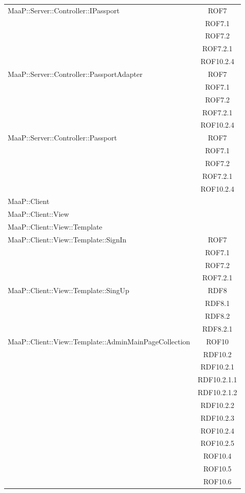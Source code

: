 \begin{center}
\begin{longtable}{|p{0.8\linewidth}|c|}
\midrule 
MaaP::Server::Controller::IPassport
& ROF7\\
& ROF7.1\\
& ROF7.2\\
& ROF7.2.1\\
& ROF10.2.4\\

\midrule 
MaaP::Server::Controller::PassportAdapter 
& ROF7\\
& ROF7.1\\
& ROF7.2\\
& ROF7.2.1\\
& ROF10.2.4\\

\midrule 
MaaP::Server::Controller::Passport
& ROF7\\
& ROF7.1\\
& ROF7.2\\
& ROF7.2.1\\
& ROF10.2.4\\

\midrule 
MaaP::Client 
& \\

\midrule 
MaaP::Client::View 
& \\

\midrule 
MaaP::Client::View::Template
& \\

\midrule 
MaaP::Client::View::Template::SignIn
& ROF7\\
& ROF7.1\\
& ROF7.2\\
& ROF7.2.1\\

\midrule 
MaaP::Client::View::Template::SingUp
& RDF8\\
& RDF8.1\\
& RDF8.2\\
& RDF8.2.1\\

\midrule 
MaaP::Client::View::Template::AdminMainPageCollection
& ROF10\\
& RDF10.2\\
& RDF10.2.1\\
& RDF10.2.1.1\\
& RDF10.2.1.2\\
& RDF10.2.2\\
& RDF10.2.3\\
& ROF10.2.4\\
& ROF10.2.5\\
& ROF10.4\\
& ROF10.5\\
& ROF10.6\\



\end{longtable}
\end{center}
